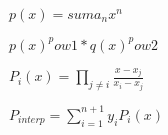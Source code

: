 \documentclass{article}
\begin{document}
$ p(x) = sum a_n x^n $
\pagebreak

$ p(x)^pow1 * q(x)^pow2 $
\pagebreak

$ P_i(x) = \prod_{j \neq i} \frac{x-x_j}{x_i-x_j} $
\pagebreak

$ P_{interp} = \sum_{i=1}^{n+1} y_iP_i(x) $
\pagebreak
\end{document}
